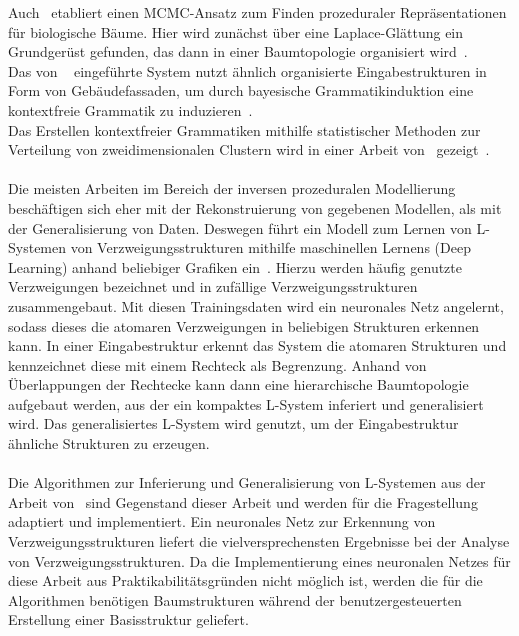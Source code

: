 Auch~\citeauthor{stava_2014} etabliert einen MCMC-Ansatz zum Finden prozeduraler Repräsentationen für biologische Bäume.
Hier wird zunächst über eine Laplace-Glättung ein Grundgerüst gefunden, das dann in einer Baumtopologie organisiert wird~\cite{stava_2014}.\\
Das von ~\citeauthor{martinovic_2013} eingeführte System nutzt ähnlich organisierte Eingabestrukturen in Form von
Gebäudefassaden, um durch bayesische Grammatikinduktion eine kontextfreie Grammatik zu induzieren~\cite{martinovic_2013}.\\
Das Erstellen kontextfreier Grammatiken mithilfe statistischer Methoden zur Verteilung von zweidimensionalen Clustern
wird in einer Arbeit von~\citeauthor{stava_2010} gezeigt~\cite{stava_2010}.\\~\\
Die meisten Arbeiten im Bereich der inversen prozeduralen Modellierung beschäftigen sich eher mit der Rekonstruierung von
gegebenen Modellen, als mit der Generalisierung von Daten.
Deswegen führt \citeauthor{guo_2020} ein Modell zum Lernen von L-Systemen von Verzweigungsstrukturen mithilfe maschinellen
Lernens (Deep Learning) anhand beliebiger Grafiken ein~\cite{guo_2020}.
Hierzu werden häufig genutzte Verzweigungen bezeichnet und in zufällige Verzweigungsstrukturen zusammengebaut.
Mit diesen Trainingsdaten wird ein neuronales Netz angelernt, sodass dieses die atomaren Verzweigungen in beliebigen
Strukturen erkennen kann.
In einer Eingabestruktur erkennt das System die atomaren Strukturen und kennzeichnet diese mit einem Rechteck als Begrenzung.
Anhand von Überlappungen der Rechtecke kann dann eine hierarchische Baumtopologie aufgebaut werden, aus der ein kompaktes
L-System inferiert und generalisiert wird.
Das generalisiertes L-System wird genutzt, um der Eingabestruktur ähnliche Strukturen zu erzeugen.\\~\\
Die Algorithmen zur Inferierung und Generalisierung von L-Systemen aus der Arbeit von~\citeauthor{guo_2020} sind
Gegenstand dieser Arbeit und werden für die Fragestellung adaptiert und implementiert.
Ein neuronales Netz zur Erkennung von Verzweigungsstrukturen liefert die vielversprechensten Ergebnisse bei der Analyse
von Verzweigungsstrukturen.
Da die Implementierung eines neuronalen Netzes für diese Arbeit aus Praktikabilitätsgründen nicht möglich ist,
werden die für die Algorithmen benötigen Baumstrukturen während der benutzergesteuerten Erstellung einer Basisstruktur
geliefert.